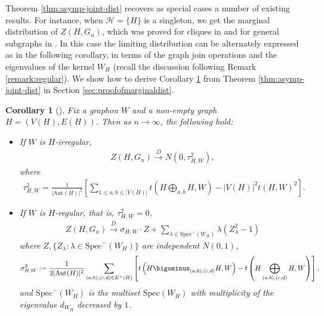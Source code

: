 \documentclass[11pt,reqno]{amsart}
\numberwithin{equation}{section}
\newcommand{\cH}{{\mathcal H}}
\newcommand\Aut{\mathrm{Aut}}
\newcommand\dto{\overset{D}{\rightarrow}}
\newtheorem{corollary}{Corollary}[section]
\theoremstyle{definition}
\begin{document}
Theorem \ref{thm:asymp-joint-dist} recovers as special cases a number of existing results. For instance, when $\cH= \{H\}$ is a singleton, we get the marginal distribution of $Z(H, G_n)$, which was proved for cliques in \cite{hladky2019limit} and for general subgraphs in \cite{BCJ}. In this case the limiting distribution can be alternately expressed as in the following corollary, in terms of the graph join operations and the eigenvalues of the kernel $W_H$ (recall the discussion following Remark \ref{remark:regular}).  We show how to derive Corollary \ref{cor:marginaldist} from Theorem \ref{thm:asymp-joint-dist} in Section \ref{sec:proofofmarginaldist}.






\begin{corollary}[{\cite[Theorem 2.9]{BCJ}}] \label{cor:marginaldist}
    Fix a graphon $W$ and a non-empty graph $H=(V(H), E(H))$. Then as $n\rightarrow \infty$, the following hold:
    \begin{itemize}
        \item If $W$ is $H$-irregular,
        \begin{align}\label{eq:ZHGvariance}
            Z(H, G_n)\dto N(0, \tau_{H,W}^2),
        \end{align}
        where 
        \begin{align}\label{eq:deftHW2}
            \tau_{H,W}^2 = \frac{1}{|\Aut(H)|^{2}}\left[\sum_{1\leq a, b\leq
            |V(H)|}t\left(H\bigoplus_{a,b}H,W\right) - |V(H)|^{2}t(H,W)^{2}\right].
        \end{align}
        
        \item If $W$ is $H$-regular, that is, $\tau_{H,W}^2 = 0$, 
        \begin{align}\label{eq:Hregularmarginal}
            Z(H, G_n)\dto \sigma_{H,W} \cdot Z+\sum_{\lambda\in \mathrm{Spec}^{-}(W_{H})}\lambda(Z_{\lambda}^{2}-1)
        \end{align}\label{eq:defsigmaHW2}
        where $Z, \{Z_{\lambda}:\lambda\in \mathrm{Spec}^{-}(W_{H})\}$ are independent $N(0,1)$, 
        \begin{align*}
            \sigma_{H,W}^{2}:=\frac{1}{2|\Aut(H)|^{2}}\sum_{(a,b),(c,d)\in
      E^{+}(H)}\left[t\left(H\bigominus_{(a,b),(c,d)}
      H,W\right)-t\left(H\bigoplus_{(a,b),(c,d)} H,W\right)\right],
        \end{align*}
        and  $\mathrm{Spec}^{-}(W_{H})$ is the multiset $\mathrm{Spec}(W_H)$ with multiplicity of the eigenvalue $d_{W_H}$ decreased by $1$.
    \end{itemize}
\end{corollary}
\end{document}
